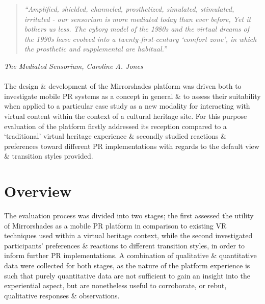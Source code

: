 \begin{quote}
	\textit{``Amplified, shielded, channeled, prosthetized, simulated, stimulated, irritated - our sensorium is more mediated today than ever before, Yet it bothers us less. The cyborg model of the 1980s and the virtual dreams of the 1990s have evolved into a twenty-first-century `comfort zone', in which the prosthetic and supplemental are habitual.''}
\end{quote}
\hfill \textit{The Mediated Sensorium, Caroline A. Jones}
\\
\\



The design \& development of the Mirrorshades platform was driven both to investigate mobile PR systems as a concept in general \& to assess their suitability when applied to a particular case study as a new modality for interacting with virtual content within the context of a cultural heritage site. For this purpose evaluation of the platform firstly addressed its reception compared to a `traditional' virtual heritage experience \& secondly studied reactions \& preferences toward different PR implementations with regards to the default view \& transition styles provided.




\section{Overview}

The evaluation process was divided into two stages; the first assessed the utility of Mirrorshades as a mobile PR platform in comparison to existing VR techniques used within a virtual heritage context, while the second investigated participants' preferences \& reactions to different transition styles, in order to inform further PR implementations. A combination of qualitative \& quantitative data were collected for both stages, as the nature of the platform experience is such that purely quantitative data are not sufficient to gain an insight into the experiential aspect, but are nonetheless useful to corroborate, or rebut, qualitative responses \& observations.

